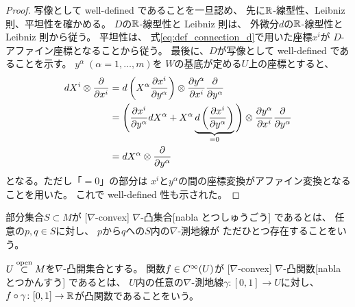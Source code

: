 \documentclass[report]{jlreq}
\begin{document}
\begin{proof}
    写像として well-defined であることを一旦認め、
    先に$\mathbb{R}$-線型性、Leibniz 則、平坦性を確かめる。
    $D$の$\mathbb{R}$-線型性と Leibniz 則は、
    外微分$d$の$\mathbb{R}$-線型性と Leibniz 則から従う。
    平坦性は、
    式\cref{eq:def_connection_d}で用いた座標$x^i$が
    $D$-アファイン座標となることから従う。
    最後に、$D$が写像として well-defined であることを示す。
    $y^\alpha \; (\alpha = 1, \dots, m)$を
    $W$の基底が定める$U$上の座標とすると、
    \begin{alignat}{1}
        dX^i \otimes \deldel{x^i}
            &=
                d\myparen{
                    X^\alpha \deldel[x^i]{y^\alpha}
                }
                \otimes
                \deldel[y^\alpha]{x^i}
                \deldel{y^\alpha}
                \\
            &=
                \Bigg(
                    \deldel[x^i]{y^\alpha} dX^\alpha
                    +
                    X^\alpha \underbrace{
                        d\myparen{
                            \deldel[x^i]{y^\alpha}
                        }
                    }_{=0}
                \Bigg)
                \otimes
                \deldel[y^\alpha]{x^i}
                \deldel{y^\alpha}
                \\
            &=
                dX^\alpha
                \otimes
                \deldel{y^\alpha}
    \end{alignat}
    となる。ただし「$= 0$」の部分は
    $x^i$と$y^\alpha$の間の座標変換がアファイン変換となることを用いた。
    これで well-defined 性も示された。
\end{proof}

\begin{definition}
    部分集合$S \subset M$が
    [$\nabla$-convex]
        {$\nabla$-凸集合}[nabla とつしゅうごう]
    であるとは、
    任意の$p, q \in S$に対し、
    $p$から$q$への$S$内の$\nabla$-測地線が
    ただひとつ存在することをいう。
\end{definition}

\begin{definition}
    $U \stackrel{\text{open}}{\subset} M$を$\nabla$-凸開集合とする。
    関数$f \in C^\infty(U)$が
    [$\nabla$-convex]
        {$\nabla$-凸関数}[nabla とつかんすう]
    であるとは、
    $U$内の任意の$\nabla$-測地線$\gamma \colon [0, 1] \to U$に対し、
    $f \circ \gamma \colon [0, 1] \to \mathbb{R}$が凸関数であることをいう。
\end{definition}
\end{document}
